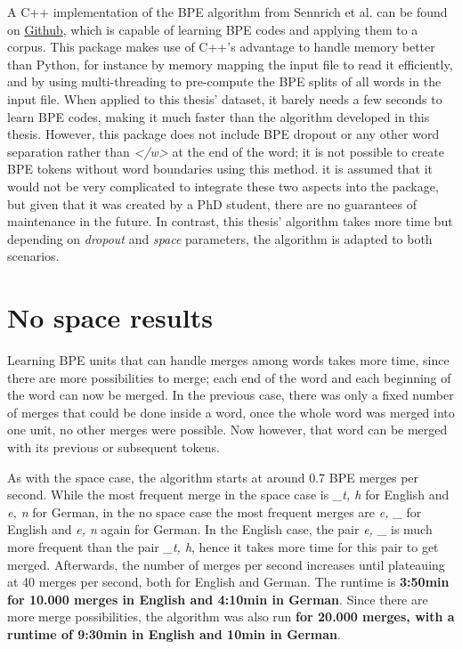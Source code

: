A C++ implementation of the BPE algorithm from Sennrich et al. can be found on \href{https://github.com/glample/fastBPE}{Github}, which is capable of learning BPE codes and applying them to a corpus. This package makes use of C++'s advantage to handle memory better than Python, for instance by memory mapping the input file to read it efficiently, and by using multi-threading to pre-compute the BPE splits of all words in the input file. When applied to this thesis' dataset, it barely needs a few seconds to learn BPE codes, making it much faster than the algorithm developed in this thesis. However, this package does not include BPE dropout or any other word separation rather than \emph{</w>} at the end of the word; it is not possible to create BPE tokens without word boundaries using this method. it is assumed that it would not be very complicated to integrate these two aspects into the package, but given that it was created by a PhD student, there are no guarantees of maintenance in the future. In contrast, this thesis' algorithm takes more time but depending on \emph{dropout} and \emph{space} parameters, the algorithm is adapted to both scenarios.

\section{No space results}

Learning BPE units that can handle merges among words takes more time, since there are more possibilities to merge; each end of the word and each beginning of the word can now be merged. In the previous case, there was only a fixed number of merges that could be done inside a word, once the whole word was merged into one unit, no other merges were possible. Now however, that word can be merged with its previous or subsequent tokens.

As with the space case, the algorithm starts at around 0.7 BPE merges per second. While the most frequent merge in the space case is \emph{\_t, h} for English and \emph{e, n} for German, in the no space case the most frequent merges are \emph{e, \_} for English and \emph{e, n} again for German. In the English case, the pair \emph{e, \_} is much more frequent than the pair \emph{\_t, h}, hence it takes more time for this pair to get merged. Afterwards, the number of merges per second increases until plateauing at 40 merges per second, both for English and German. The runtime is \textbf{3:50min for 10.000 merges in English and 4:10min in German}. Since there are more merge possibilities, the algorithm was also run \textbf{for 20.000 merges, with a runtime of 9:30min in English and 10min in German}.

